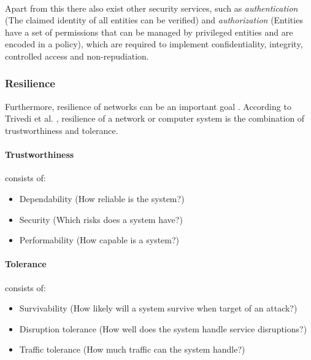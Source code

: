 \paragraph{} Apart from this there also exist other security services, such as \textit{authentication} (The claimed identity of all entities can be verified) and \textit{authorization} (Entities have a set of permissions that can be managed by privileged entities and are encoded in a policy), which are required to implement confidentiality, integrity, controlled access and non-repudiation.



\subsubsection{Resilience}
Furthermore, resilience of networks can be an important goal \cite{resilience}. According to Trivedi et al. \cite{resilience}, resilience of a network or computer system is the combination of trustworthiness and tolerance.

\paragraph{Trustworthiness} consists of:
\begin{itemize}
    \item Dependability (How reliable is the system?)
    \item Security (Which risks does a system have?)
    \item Performability (How capable is a system?)
\end{itemize}

\paragraph{Tolerance} consists of:
\begin{itemize}
    \item Survivability (How likely will a system survive when target of an attack?)
    \item Disruption tolerance (How well does the system handle service disruptions?)
    \item Traffic tolerance (How much traffic can the system handle?)
\end{itemize}

